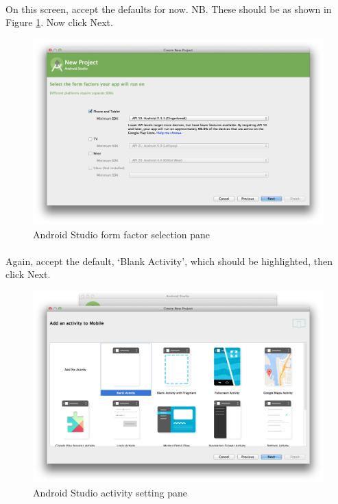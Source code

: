 \documentclass[12pt, a4paper, twoside]{book}
\begin{document}
\paragraph{} On this screen, accept the defaults for now. NB. These should be as shown in Figure \ref{fig:android.studio_form}. Now click Next.

\begin{figure}[H]
\centering
\includegraphics[width=\textwidth]{images/android-studio_03_form-factors}
\caption{Android Studio form factor selection pane}
\label{fig:android.studio_form}
\end{figure}

\paragraph{} Again, accept the default, `Blank Activity', which should be highlighted, then click Next.

\begin{figure}[H]
\centering
\includegraphics[width=\textwidth]{images/android-studio_06_activity}
\caption{Android Studio activity setting pane}
\label{fig:android.studio_activity}
\end{figure}
\end{document}
